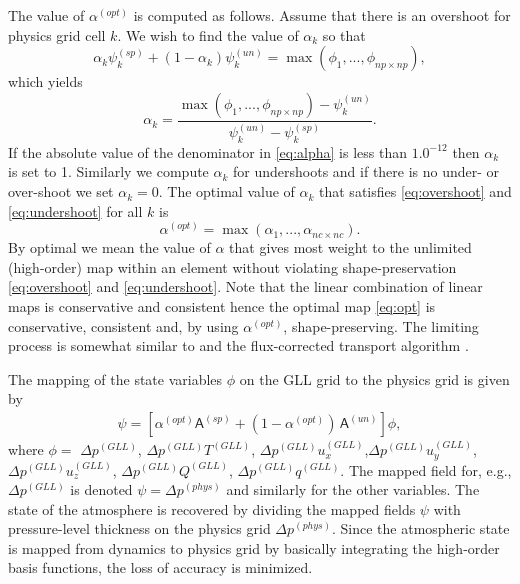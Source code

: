 \documentclass[twocol]{ametsoc}
\begin{document}
The value of $\alpha^{(opt)}$ is computed as follows. Assume that there is an overshoot for physics grid cell $k$. We wish to find the value of $\alpha_k$ so that
\begin{equation}
\alpha_k \psi_k^{(sp)}+(1-\alpha_k) \psi_k^{(un)}=\max(\phi_1,...,\phi_{np\times np}),
\end{equation}
which yields
\begin{equation}
\alpha_k = \frac{\max(\phi_1,...,\phi_{np\times np})-\psi_k^{(un)}}{\psi_k^{(un)}-\psi_k^{(sp)}}.
\label{eq:alpha}
\end{equation}
If the absolute value of the denominator in \eqref{eq:alpha} is less than $1.0^{-12}$ then $\alpha_k$ is set to 1. Similarly we compute $\alpha_k$ for undershoots and if there is no under- or over-shoot we set $\alpha_k=0$. The optimal value of $\alpha_k$ that satisfies \eqref{eq:overshoot} and \eqref{eq:undershoot} for all $k$ is
\begin{equation}
\alpha^{(opt)}=\max(\alpha_1, ...,\alpha_{nc\times nc}).
\end{equation}
By optimal we mean the value of $\alpha$ that gives most weight to the unlimited (high-order) map within an element without violating shape-preservation \eqref{eq:overshoot} and \eqref{eq:undershoot}. Note that the linear combination of linear maps is conservative and consistent hence the optimal map \eqref{eq:opt} is conservative, consistent and, by using $\alpha^{(opt)}$, shape-preserving. The limiting process is somewhat similar to \citet{BJ1989} and the flux-corrected transport algorithm \citep{Z1979JCP}.

The mapping of the state variables $\phi$ on the GLL grid to the physics grid is given by
\begin{multline}
\bm{\mathsf{\psi}}=\left[ \alpha^{(opt)} \bm{\mathsf{A}}^{(sp)}+(1-\alpha^{(opt)})\, \bm{\mathsf{A}}^{(un)}\right] \bm{\mathsf{\phi}},
\end{multline}
where $\phi=$ $\Delta p^{(GLL)}$, $\Delta p^{(GLL)}T^{(GLL)}$, $\Delta p^{(GLL)}u_x^{(GLL)}$,$\Delta p^{(GLL)}u_y^{(GLL)}$,$\Delta p^{(GLL)}u_z^{(GLL)}$, $\Delta p^{(GLL)}Q^{(GLL)}$, $\Delta p^{(GLL)}q^{(GLL)}$. The mapped field for, e.g., $\Delta p^{(GLL)}$ is denoted $\psi=\Delta p^{(phys)}$ and similarly for the other variables. The state of the atmosphere is recovered by dividing the mapped fields $\psi$ with pressure-level thickness on the physics grid $\Delta p^{(phys)}$. Since the atmospheric state is mapped from dynamics to physics grid by basically integrating the high-order basis functions, the loss of accuracy is minimized.
%
%
\end{document}
